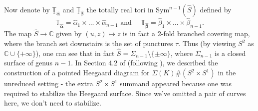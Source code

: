 \documentclass[11pt]{article}
\theoremstyle{plain} \newtheorem{thm}{Theorem}[subsection]
\theoremstyle{plain} \newtheorem{cor}[thm]{Corollary}
\theoremstyle{plain} \newtheorem{prop}[thm]{Proposition}
\theoremstyle{plain} \newtheorem{conj}[thm]{Conjecture}
\theoremstyle{plain} \newtheorem{lem}[thm]{Lemma}
\theoremstyle{definition} \newtheorem{df}[thm]{Definition}
\theoremstyle{remark} \newtheorem{rmk}[thm]{Remark}
\theoremstyle{remark} \newtheorem{obs}[thm]{Observation}
\newcommand{\DBCs}[1]{\Sigma(#1)\#(S^{2}\times S^{1})}
\newcommand{\SxS}{S^{2}\times S^{1}}
\newcommand{\red}[1]{\underline{#1}}
\newcommand{\ah}{\widehat{\alpha}}
\newcommand{\bh}{\widehat{\beta}}
\newcommand{\ba}{\boldsymbol{\alpha}}
\newcommand{\bb}{\boldsymbol{\beta}}
\newcommand{\bah}{\widehat{\ba}}
\newcommand{\bbh}{\widehat{\bb}}
\newcommand{\Tahr}{\red{\mathbb{T}}_{\bah}}
\newcommand{\Tbhr}{\red{\mathbb{T}}_{\bbh}}
\numberwithin{equation}{section}
\begin{document}
Now denote by $\Tahr$ and $\Tbhr$ the totally real tori in $\text{Sym}^{n-1}(\widehat{S})$ defined by
\begin{equation*}
\Tahr = \ah_{1} \times \ldots \times \ah_{n-1} \text{ and } \quad \Tbhr = \bh_{1} \times \ldots \times \bh_{n-1}.
\end{equation*}
The map $\widehat{S} \rightarrow \mathbb{C}$ given by $(u,z) \mapsto z$ is in fact a 2-fold branched covering map, where the branch set downstairs is the set of punctures $\tau$.  Thus (by viewing $S^2$ as $\mathbb{C} \cup \{ +\infty \}$), one can see that in fact $\widehat{S} = \Sigma_{n-1} \setminus \{ \pm \infty \}$, where $\Sigma_{n-1}$ is a closed surface of genus $n-1$.  In Section 4.2 of \cite{et:R} (following \cite{cm:R}), we described the construction of a pointed Heegaard diagram for $\DBCs{K}$ in the unreduced setting - the extra $\SxS$ summand appeared because one was required to stabilize the Heegaard surface.  Since we've omitted a pair of curves here, we don't need to stabilize.
\end{document}
